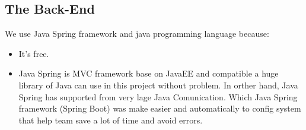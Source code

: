 \documentclass[a4paper,12pt]{article}
\begin{document}
\subsection{The Back-End}
We use Java Spring framework and java programming language because:
\begin{itemize}
	\item It's free.
	\item Java Spring is MVC framework base on JavaEE and compatible a huge library of Java can use in this project without problem. In orther hand, Java Spring has supported from very lage Java Comunication. Which Java Spring framework (Spring Boot) was make easier and automatically to config system that help team save a lot of time and avoid errors.
\end{itemize}
\end{document}
